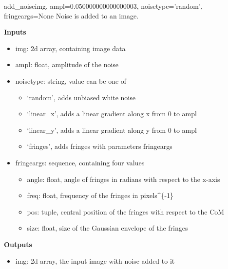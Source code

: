 \documentclass[letterpaper,10pt,english]{manual}
\begin{document}
\hypertarget{refimages.add_noise}{}\begin{funcdesc}{add\_noise}{img, ampl=0.050000000000000003, noisetype='random', fringeargs=None}
Noise is added to an image.

\textbf{Inputs}
\begin{itemize}
\item {} 
img: 2d array, containing image data

\item {} 
ampl: float, amplitude of the noise

\item {} 
noisetype: string, value can be one of
\begin{itemize}
\item {} 
`random', adds unbiased white noise

\item {} 
`linear\_x', adds a linear gradient along x from 0 to ampl

\item {} 
`linear\_y', adds a linear gradient along y from 0 to ampl

\item {} 
`fringes', adds fringes with parameters fringeargs

\end{itemize}

\item {} 
fringeargs: sequence, containing four values
\begin{itemize}
\item {} 
angle: float, angle of fringes in radians with respect to the x-axis

\item {} 
freq: float, frequency of the fringes in pixels\textasciicircum{}\{-1\}

\item {} 
pos: tuple, central position of the fringes with respect to the CoM

\item {} 
size: float, size of the Gaussian envelope of the fringes

\end{itemize}

\end{itemize}

\textbf{Outputs}
\begin{itemize}
\item {} 
img: 2d array, the input image with noise added to it

\end{itemize}
\end{funcdesc}
\end{document}
